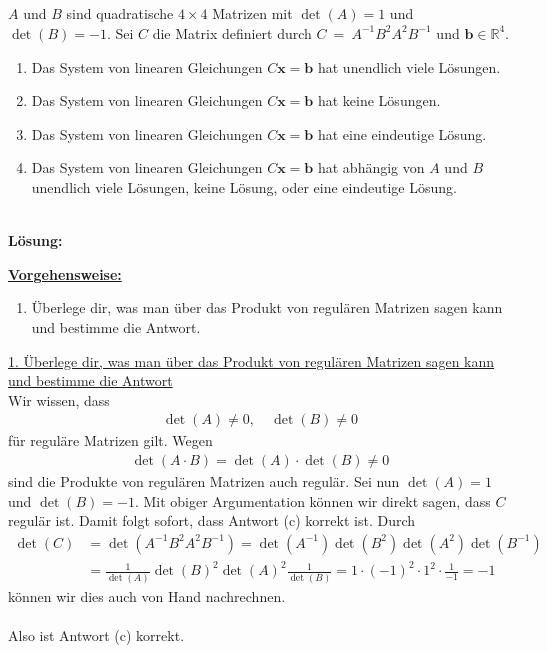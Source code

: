\newpage

\subsection*{}
$A$ und $B$ sind quadratische $4 \times 4$ Matrizen mit
$\det(A) = 1$ und $\det(B) = -1$.
Sei $C$ die Matrix definiert durch 
$C \ = \ A^{-1}B^2 A^2 B^{-1}$ und $\textbf{b} \in \mathbb{R}^4$.
\renewcommand{\labelenumi}{(\alph{enumi})}
\begin{enumerate}
\item 
Das System von linearen Gleichungen $C \textbf{x} = \textbf{b}$ hat unendlich viele Lösungen.
\item
Das System von linearen Gleichungen $C \textbf{x} = \textbf{b}$ hat keine Lösungen.
\item
Das System von linearen Gleichungen $C \textbf{x} = \textbf{b}$ hat eine eindeutige Lösung.
\item
Das System von linearen Gleichungen $C \textbf{x} = \textbf{b}$ hat abhängig von $A$ und $B$ unendlich viele Lösungen, keine Lösung, oder eine eindeutige Lösung.
\end{enumerate}
\ \\
\textbf{Lösung:}
\begin{mdframed}
\underline{\textbf{Vorgehensweise:}}
\renewcommand{\labelenumi}{\theenumi.}
\begin{enumerate}
\item Überlege dir, was man über das Produkt von regulären Matrizen sagen kann und bestimme die Antwort.
\end{enumerate}
\end{mdframed}

\underline{1. Überlege dir, was man über das Produkt von regulären Matrizen sagen kann und bestimme die Antwort}\\
Wir wissen, dass 
\begin{align*}
\det(A) \neq 0, \quad \det(B) \neq 0
\end{align*}
für reguläre Matrizen gilt.
Wegen
\begin{align*}
\det(A \cdot B) = \det(A) \cdot \det(B) \neq 0
\end{align*}
sind die Produkte von regulären Matrizen auch regulär.
Sei nun $\det(A) = 1$ und $\det(B) = -1$.
Mit obiger Argumentation können wir direkt sagen, dass $C$ regulär ist.
Damit folgt sofort, dass Antwort (c) korrekt ist.
Durch 
\begin{align*}
\det(C) &= \det( A^{-1}B^2 A^2 B^{-1})
= \det(A^{-1}) \det(B^2) \det(A^2) \det(B^{-1})\\
&= \frac{1}{\det(A)}  \det(B)^2 \det(A)^2 \frac{1}{\det(B)}
= 1 \cdot (-1)^2 \cdot 1^2 \cdot \frac{1}{-1}
= -1
\end{align*}
können wir dies auch von Hand nachrechnen.\\
\\
Also ist Antwort (c) korrekt.

